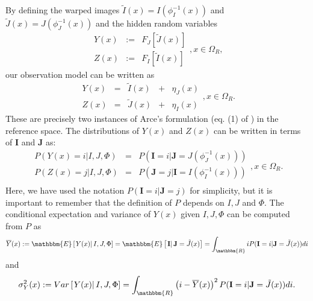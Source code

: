By defining the warped images \hbox{$\tilde{I}(x) = I(\phi_{I}^{-1}(x))$} and \hbox{$\tilde{J}(x) = J(\phi_{J}^{-1}(x))$} and the hidden random variables
\begin{equation}\label{eq:hidden_fields}
    \begin{array}{ccc}
        Y(x) &:=& F_{J}\left[\tilde{J}(x)\right]\\
        Z(x) &:=& F_{I}\left[\tilde{I}(x)\right]
    \end{array},x\in\Omega_{R},
\end{equation}
our observation model can be written as
\begin{equation}\label{eq:SyNEM_gom_update}
    \begin{array}{ccccc}
    	Y(x) &=& \tilde{I}(x) &+& \eta_{J}(x)\\
        Z(x) &=& \tilde{J}(x) &+& \eta_{I}(x)
    \end{array}, x\in\Omega_{R}.
\end{equation}
These are precisely two instances of Arce's formulation (eq. (1) of \cite{Arce-santana2014}) in the reference space. The distributions of $Y(x)$ and $Z(x)$ can be written in terms of $\mathbf{I}$ and $\mathbf{J}$ as:
\begin{equation}\label{eq:y_z_i_j_relationship}
    \begin{array}{ccccc}
    	P(Y(x) = i | I, J, \Phi) &=& P(\mathbf{I}=i | \mathbf{J} = J(\phi_{J}^{-1}(x)))\\
        P(Z(x) = j | I, J, \Phi) &=& P(\mathbf{J}=j | \mathbf{I} = I(\phi_{I}^{-1}(x)))\\
    \end{array}, x\in\Omega_{R}.
\end{equation}
Here, we have used the notation $P(\mathbf{I}=i | \mathbf{J} = j)$ for simplicity, but it is important to remember that the definition of $P$ depends on $I, J$ and $\Phi$. The conditional expectation and variance of $Y(x)$ given $I, J, \Phi$ can be computed from $P$ as
\begin{equation}\label{eq:expectation_transfer}
    \overline{Y}(x) := \mathbbm{E}\left[\left.Y(x) \right| I, J, \Phi\right] = \mathbbm{E}\left[\left.\mathbf{I} \right| \mathbf{J} = \tilde{J}(x)\right] =
    \int_{\mathbbm{R}} i P(\mathbf{I}=i | \mathbf{J}=\tilde{J}(x)) di
\end{equation}
and
\begin{equation}\label{eq:expectation_variance}
    \sigma_{Y}^{2}(x) := Var\left[\left.Y(x) \right| I, J, \Phi\right] = \int_{\mathbbm{R}} \left(i - \overline{Y}(x)\right)^{2} P(\mathbf{I}=i | \mathbf{J}=\tilde{J}(x)) di.
\end{equation}
